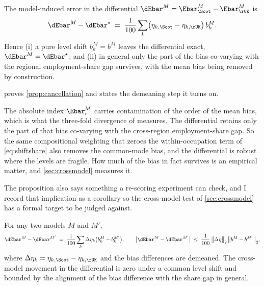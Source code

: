 \begin{proposition}\label{prop:cancellation}
The model-induced error in the differential $\dEbar^{M} = \Ebar^{M}_{\Scot} - \Ebar^{M}_{\rUK}$ is
\begin{equation}\label{eq:prop1}
\dEbar^{M} - \dEbar^{\star} \;=\;
\frac{1}{100} \sum_k \bigl(\eta_{k,\Scot} - \eta_{k,\rUK}\bigr)\,
b^{M}_k .
\end{equation}
Hence (i) a pure level shift $b^{M}_k = b^{M}$ leaves the differential exact, $\dEbar^{M} = \dEbar^{\star}$; and (ii) in general only the part of the bias co-varying with the regional employment-share gap survives, with the mean bias being removed by construction.
\end{proposition}

\noindent
{} proves \cref{prop:cancellation} and states the demeaning step it turns on.

The absolute index $\Ebar^{M}_r$ carries contamination of the order of the mean bias, which is what the three-fold divergence of \citet{yin2026} measures. The differential retains only the part of that bias co-varying with the cross-region employment-share gap. So the same compositional weighting that zeroes the within-occupation term of \cref{eq:shiftshare} also removes the common-mode bias, and the differential is robust where the levels are fragile. How much of the bias in fact survives is an empirical matter, and \cref{sec:crossmodel} measures it.

The proposition also says something a re-scoring experiment can check, and I record that implication as a corollary so the cross-model test of \cref{sec:crossmodel} has a formal target to be judged against.

\begin{corollary}\label{cor:crossmodel}
For any two models $M$ and $M'$,
\begin{equation}\label{eq:cor1}
\dEbar^{M} - \dEbar^{M'} \;=\;
\frac{1}{100} \sum_k \Delta\eta_k
\bigl(b^{M}_k - b^{M'}_k\bigr),
\qquad
\bigl|\dEbar^{M} - \dEbar^{M'}\bigr| \;\le\;
\frac{1}{100}\,\bigl\lVert \Delta\eta \bigr\rVert_2\,
\bigl\lVert b^{M} - b^{M'} \bigr\rVert_2 ,
\end{equation}
where $\Delta\eta_k = \eta_{k,\Scot} - \eta_{k,\rUK}$ and the bias differences are demeaned. The cross-model movement in the differential is zero under a common level shift and bounded by the alignment of the bias difference with the share gap in general.
\end{corollary}

